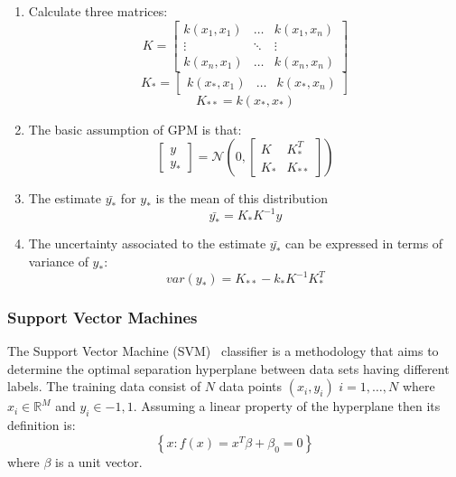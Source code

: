 \begin{enumerate}
\item Calculate three matrices:
\begin{equation}
K=\begin{bmatrix}
k(x_1,x_1) &  \ldots & k(x_1,x_n)\\
\vdots  & \ddots &\vdots  \\
k(x_n,x_1) &  \ldots & k(x_n,x_n)
\end{bmatrix}
\end{equation}
\begin{equation}
K_*= \begin{bmatrix}
k(x_*,x_1) & \ldots & k(x_*,x_n)
\end{bmatrix}
\end{equation}
\begin{equation}
K_{**}=k(x_*,x_*)
\end{equation}
\item The basic assumption of GPM is that:
\begin{equation}
\begin{bmatrix}
y\\
y_*
\end{bmatrix}
=\mathcal{N}(0,\begin{bmatrix}
K & K_{*}^{T}\\
K_* & K_{**}
\end{bmatrix})
\end{equation}
\item The estimate $\bar{y_*} $ for $y_*$ is the mean of this distribution
\begin{equation}
\bar{y_*}=K_* K^{-1}y
\end{equation}
\item The uncertainty associated to the estimate $\bar{y_*} $ can be expressed in terms of variance of  $y_*$:
\begin{equation}
var(y_*)=K_{**}-k_* K^{-1} K_{*}^{T}
\end{equation}
\end{enumerate}

\subsubsection{Support Vector Machines}
\label{sec:SVM}
The Support Vector Machine (SVM)~\cite{SVM_Burges} classifier is a methodology that aims to determine the optimal separation hyperplane between data sets having different labels.
The training data consist of $N$ data points $(x_i,y_i)$ $i=1,\ldots,N$ where $x_i \in \mathbb{R}^M$ and $y_i \in {-1,1}$.
Assuming a linear property of the hyperplane  then its definition is:
\begin{equation}
\left \{ x: f(x)=x^T\beta+\beta_0=0 \right \}
\end{equation}
where $\beta$ is a unit vector.


